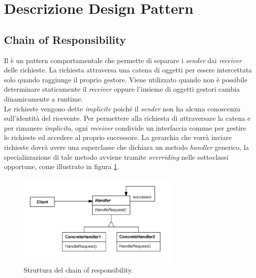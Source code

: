 \pagebreak
\section{Descrizione Design Pattern}
\label{appendice-pattern}



	\subsection{Chain of Responsibility} %
	Il  è un pattern comportamentale che permette di separare i \emph{sender} dai \emph{receiver} delle richieste. La richiesta attraversa una catena di oggetti per essere intercettata solo quando raggiunge il proprio gestore. Viene utilizzato quando non è possibile determinare staticamente il \emph{receiver} oppure l'insieme di oggetti gestori cambia dinamicamente a runtime. \\ Le richieste vengono dette \emph{implicite} poiché il \emph{sender} non ha alcuna conoscenza sull'identità del ricevente. Per permettere alla richiesta di attraversare la catena e per rimanere \emph{implicita}, ogni \emph{receiver} condivide un interfaccia comune per gestire le richieste ed accedere al proprio successore. 
	La gerarchia che vorrà inviare richieste dovrà avere una superclasse che dichiara un metodo \emph{handler} generico, la specializzazione di tale metodo avviene tramite \emph{overriding} nelle sottoclassi opportune, come illustrato in figura \ref{fig:chainofresponsibility}.
	
	\begin{figure}[h]
	\centering \includegraphics[width=0.7\textwidth]{patterns/ChainOfResponsability.png}
	\caption{Struttura del chain of responsibility.}
	\label{fig:chainofresponsibility}
	\end{figure}
	
